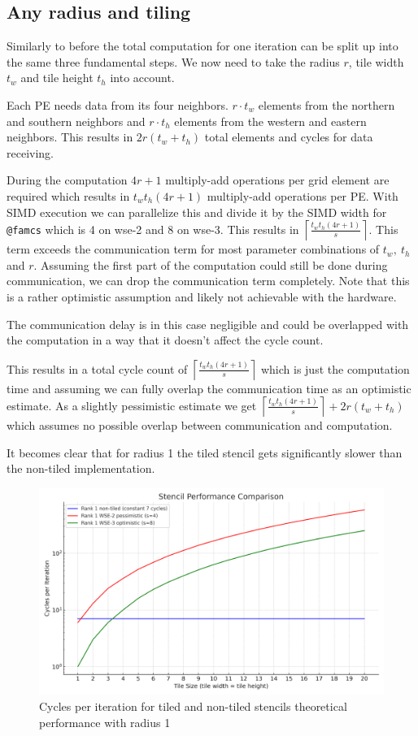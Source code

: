 \documentclass{article}
\begin{document}
\subsection{Any radius and tiling}
Similarly to before the total computation for one iteration can be split up into the same three fundamental steps. We now need to take the radius $r$, tile width $t_w$ and tile height $t_h$ into account.

Each PE needs data from its four neighbors. $r\cdot t_w$ elements from the northern and southern neighbors and $r\cdot t_h$ elements from the western and eastern neighbors. This results in $2r(t_w+t_h)$ total elements and cycles for data receiving.

During the computation $4r+1$ multiply-add operations per grid element are required which results in $t_wt_h(4r+1)$ multiply-add operations per PE. With SIMD execution we can parallelize this and divide it by the SIMD width for \texttt{@famcs} which is 4 on wse-2 and 8 on wse-3. This results in $\left\lceil\frac{t_wt_h(4r+1)}{s}\right\rceil$. This term exceeds the communication term for most parameter combinations of $t_w,\ t_h$ and $r$. Assuming the first part of the computation could still be done during communication, we can drop the communication term completely. Note that this is a rather optimistic assumption and likely not achievable with the hardware.

The communication delay is in this case negligible and could be overlapped with the computation in a way that it doesn't affect the cycle count. 

This results in a total cycle count of $\left\lceil\frac{t_wt_h(4r+1)}{s}\right\rceil$ which is just the computation time and assuming we can fully overlap the communication time as an optimistic estimate. As a slightly pessimistic estimate we get $\left\lceil\frac{t_wt_h(4r+1)}{s}\right\rceil+2r(t_w+t_h)$ which assumes no possible overlap between communication and computation. 

It becomes clear that for radius 1 the tiled stencil gets significantly slower than the non-tiled implementation. 
\begin{figure}
    \centering
    \includegraphics[width=0.5\linewidth]{plots/stencil_performance_comparison.png}
    \caption{Cycles per iteration for tiled and non-tiled stencils theoretical performance with radius 1 }
    \label{fig:enter-label}
\end{figure}
\end{document}
